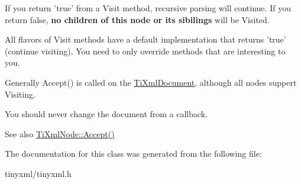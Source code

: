 \-If you return 'true' from a \-Visit method, recursive parsing will continue. \-If you return false, {\bfseries no children of this node or its sibilings} will be \-Visited.

\-All flavors of \-Visit methods have a default implementation that returns 'true' (continue visiting). \-You need to only override methods that are interesting to you.

\-Generally \-Accept() is called on the \hyperlink{class_ti_xml_document}{\-Ti\-Xml\-Document}, although all nodes suppert \-Visiting.

\-You should never change the document from a callback.

\begin{DoxySeeAlso}{\-See also}
\hyperlink{class_ti_xml_node_acc0f88b7462c6cb73809d410a4f5bb86}{\-Ti\-Xml\-Node\-::\-Accept()} 
\end{DoxySeeAlso}


\-The documentation for this class was generated from the following file\-:\begin{DoxyCompactItemize}
\item 
tinyxml/tinyxml.\-h\end{DoxyCompactItemize}

